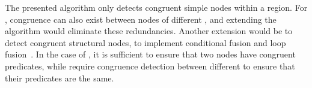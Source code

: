 The presented algorithm only detects congruent simple nodes within a region. For \gammanodes,
congruence can also exist between nodes of different \gammaregions, and extending the
algorithm would eliminate these redundancies. Another extension would
be to detect congruent structural nodes, to implement conditional fusion
\cite{Rugina00} and loop fusion~\cite{manjikian97}. In
the case of \gammanodes, it is sufficient to ensure that two nodes have congruent
predicates, while \thetanodes require congruence detection between
different \thetaregions to ensure that their predicates are the same.

